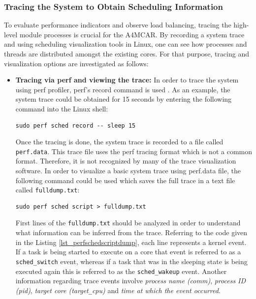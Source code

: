 \subsubsection{Tracing the System to Obtain Scheduling Information}
To evaluate performance indicators and observe load balancing, tracing the high-level module processes is crucial for the A4MCAR. By recording a system trace and using scheduling visualization tools in Linux, one can see how processes and threads are distributed amongst the existing cores. For that purpose, tracing and visualization options are investigated as follows:
\begin{itemize}
	\item \textbf{Tracing via perf and viewing the trace:}
	In order to trace the system using perf profiler, perf's record command is used \cite{perf2}. As an example, the system trace could be obtained for 15 seconds by entering the following command into the Linux shell:
	\begin{lstlisting}[style=bash]
		sudo perf sched record -- sleep 15
	\end{lstlisting}
	Once the tracing is done, the system trace is recorded to a file called \texttt{perf.data}. This trace file uses the perf tracing format which is not a common format. Therefore, it is not recognized by many of the trace visualization software. In order to visualize a basic system trace using perf.data file, the following command could be used which saves the full trace in a text file called \texttt{fulldump.txt}:
	\begin{lstlisting}[style=bash]
		sudo perf sched script > fulldump.txt
	\end{lstlisting}
	First lines of the \texttt{fulldump.txt} should be analyzed in order to understand what information can be inferred from the trace. Referring to the code given in the Listing \ref{lst_perfschedscriptdump}, each line represents a kernel event. If a task is being started to execute on a core that event is referred to as a \texttt{sched\texttt{\_}switch} event, whereas if a task that was in the sleeping state is being executed again this is referred to as the \texttt{sched\texttt{\_}wakeup} event. Another information regarding trace events involve \textit{process name (comm)}, \textit{process ID (pid)}, \textit{target core (target\texttt{\_}cpu)} and \textit{time at which the event occurred}. 
	
	

\end{itemize}
